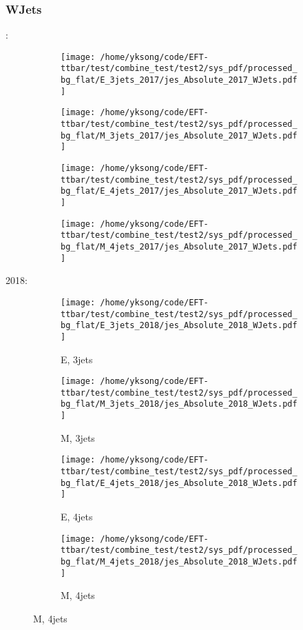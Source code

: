 \documentclass{beamer}
\begin{document}
\begin{frame}
\frametitle{WJets}
\fontsize{5}{1}:
\begin{figure}
\centering
\begin{subfigure}[b]{0.24\textwidth}
\texttt{[image: /home/yksong/code/EFT-ttbar/test/combine\_test/test2/sys\_pdf/processed\_bg\_flat/E\_3jets\_2017/jes\_Absolute\_2017\_WJets.pdf]}
\end{subfigure}
\begin{subfigure}[b]{0.24\textwidth}
\texttt{[image: /home/yksong/code/EFT-ttbar/test/combine\_test/test2/sys\_pdf/processed\_bg\_flat/M\_3jets\_2017/jes\_Absolute\_2017\_WJets.pdf]}
\end{subfigure}
\begin{subfigure}[b]{0.24\textwidth}
\texttt{[image: /home/yksong/code/EFT-ttbar/test/combine\_test/test2/sys\_pdf/processed\_bg\_flat/E\_4jets\_2017/jes\_Absolute\_2017\_WJets.pdf]}
\end{subfigure}
\begin{subfigure}[b]{0.24\textwidth}
\texttt{[image: /home/yksong/code/EFT-ttbar/test/combine\_test/test2/sys\_pdf/processed\_bg\_flat/M\_4jets\_2017/jes\_Absolute\_2017\_WJets.pdf]}
\end{subfigure}
\end{figure}
2018:
\begin{figure}
\centering
\begin{subfigure}[b]{0.24\textwidth}
\texttt{[image: /home/yksong/code/EFT-ttbar/test/combine\_test/test2/sys\_pdf/processed\_bg\_flat/E\_3jets\_2018/jes\_Absolute\_2018\_WJets.pdf]}
\captionsetup{font=tiny}
\caption{E, 3jets}
\end{subfigure}
\begin{subfigure}[b]{0.24\textwidth}
\texttt{[image: /home/yksong/code/EFT-ttbar/test/combine\_test/test2/sys\_pdf/processed\_bg\_flat/M\_3jets\_2018/jes\_Absolute\_2018\_WJets.pdf]}
\captionsetup{font=tiny}
\caption{M, 3jets}
\end{subfigure}
\begin{subfigure}[b]{0.24\textwidth}
\texttt{[image: /home/yksong/code/EFT-ttbar/test/combine\_test/test2/sys\_pdf/processed\_bg\_flat/E\_4jets\_2018/jes\_Absolute\_2018\_WJets.pdf]}
\captionsetup{font=tiny}
\caption{E, 4jets}
\end{subfigure}
\begin{subfigure}[b]{0.24\textwidth}
\texttt{[image: /home/yksong/code/EFT-ttbar/test/combine\_test/test2/sys\_pdf/processed\_bg\_flat/M\_4jets\_2018/jes\_Absolute\_2018\_WJets.pdf]}
\captionsetup{font=tiny}
\caption{M, 4jets}
\end{subfigure}
\end{figure}
\end{frame}
\end{document}
